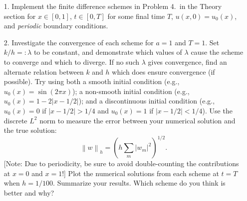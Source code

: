 \documentclass{article}
\providecommand{\abs}[1]{\left\lvert#1\right\rvert}
\providecommand{\norm}[1]{\left\lVert#1\right\rVert}
\begin{document}
\begin{itemize}

\item[1.] Implement the finite difference schemes in Problem 4.\ in the Theory section for $x \in [0,1]$, $t \in [0,T]$ for some final time $T$, $u(x,0) = u_0(x)$, and \emph{periodic} boundary conditions.

\item[2.] Investigate the convergence of each scheme for $a = 1$ and $T = 1$. Set $k/h =: \lambda$ to be constant, and demonstrate which values of $\lambda$ cause the scheme to converge and which to diverge. If no such $\lambda$ gives convergence, find an alternate relation between $k$ and $h$ which does ensure convergence (if possible). Try using both a smooth initial condition (e.g., $u_0(x) = \sin(2 \pi x)$); a non-smooth initial condition (e.g., $u_0(x) = 1 - 2 \abs{x - 1/2}$); and a discontinuous initial condition (e.g., $u_0(x) = 0$ if $\abs{x - 1/2} > 1/4$ and $u_0(x) = 1$ if $\abs{x - 1/2} < 1/4$). Use the discrete $L^2$ norm to measure the error between your numerical solution and the true solution:
\begin{equation*}
\norm{w}_h = \left( h \sum_m \abs{w_m}^2 \right)^{1/2}.
\end{equation*}
[Note: Due to periodicity, be sure to avoid double-counting the contributions at $x = 0$ and $x = 1$!] Plot the numerical solutions from each scheme at $t = T$ when $h = 1/100$. Summarize your results. Which scheme do you think is better and why?

\end{itemize}
\end{document}
